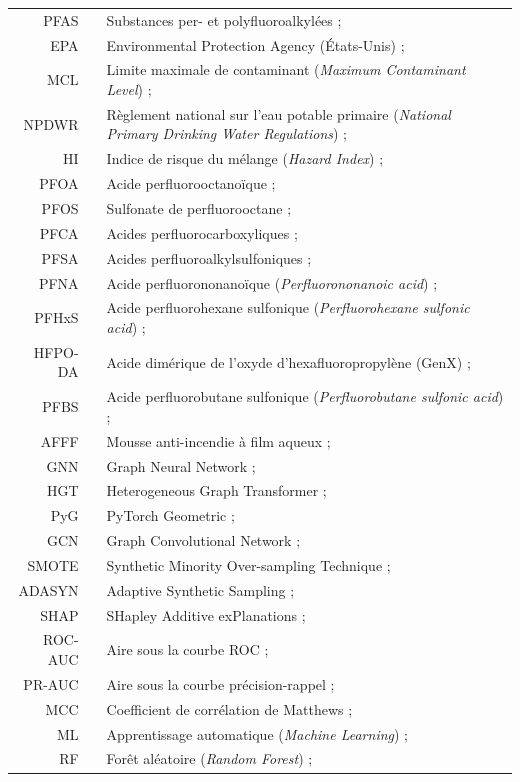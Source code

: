 \begin{longtable}{rp{5mm}p{12cm}}
		PFAS & & Substances per- et polyfluoroalkyl\'ees ; \\
		EPA & & Environmental Protection Agency (\'Etats-Unis) ; \\
		MCL & & Limite maximale de contaminant (\emph{Maximum Contaminant Level}) ; \\
		NPDWR & & R\`eglement national sur l'eau potable primaire (\emph{National Primary Drinking Water Regulations}) ; \\
		HI & & Indice de risque du m\'elange (\emph{Hazard Index}) ; \\
		PFOA & & Acide perfluorooctano\"ique ; \\
		PFOS & & Sulfonate de perfluorooctane ; \\
		PFCA & & Acides perfluorocarboxyliques ; \\
		PFSA & & Acides perfluoroalkylsulfoniques ; \\
		PFNA & & Acide perfluorononano\"ique (\emph{Perfluorononanoic acid}) ; \\
		PFHxS & & Acide perfluorohexane sulfonique (\emph{Perfluorohexane sulfonic acid}) ; \\
		HFPO-DA & & Acide dim\'erique de l'oxyde d'hexafluoropropyl\`ene (GenX) ; \\
		PFBS & & Acide perfluorobutane sulfonique (\emph{Perfluorobutane sulfonic acid}) ; \\
		AFFF & & Mousse anti-incendie \`a film aqueux ; \\
		GNN & & Graph Neural Network ; \\
		HGT & & Heterogeneous Graph Transformer ; \\
		PyG & & PyTorch Geometric ; \\
		GCN & & Graph Convolutional Network ; \\
		SMOTE & & Synthetic Minority Over-sampling Technique ; \\
		ADASYN & & Adaptive Synthetic Sampling ; \\
		SHAP & & SHapley Additive exPlanations ; \\
		ROC-AUC & & Aire sous la courbe ROC ; \\
		PR-AUC & & Aire sous la courbe pr\'ecision-rappel ; \\
		MCC & & Coefficient de corr\'elation de Matthews ; \\
		ML & & Apprentissage automatique (\emph{Machine Learning}) ; \\
		RF & & For\^et al\'eatoire (\emph{Random Forest}) ; \\

\end{longtable}
